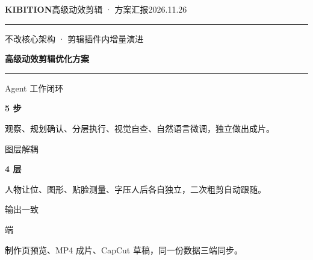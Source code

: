 \documentclass[10pt,a4paper,fontset=none]{ctexart}
\newcommand{\Thin}{\LatinThin\CJKthin}
\begin{document}
\thispagestyle{empty}
\enlargethispage{1.4cm}
\pagecolor{DarkBg}
\color{white}
\hypersetup{linkcolor=white}
\vspace*{-0.6cm}
\noindent
{\fontsize{9.5}{12}\selectfont\textbf{KIBITION}}\hfill{\fontsize{9}{12}\selectfont 高级动效剪辑 · 方案汇报\hspace{1.6em}2026.11.26}\par
\vspace{0.45cm}
{\color{white}\rule{\linewidth}{0.5pt}}

\vspace{1.0cm}
{\fontsize{12}{15}\selectfont 不改核心架构 · 剪辑插件内增量演进\par}
\vspace{0.35cm}
{\fontsize{32}{40}\selectfont\bfseries 高级动效剪辑优化方案\par}

\vspace{0.75cm}
\noindent{}

\vspace{0.5cm}
{\color{white}\rule{\linewidth}{0.8pt}}\par
\vspace{0.45cm}

\noindent
\begin{minipage}[t]{0.3\linewidth}
  {\fontsize{9}{11}\selectfont Agent 工作闭环}\par\vspace{0.12cm}
  {\fontsize{26}{30}\selectfont\bfseries 5 步}\par\vspace{0.3cm}
  {\fontsize{8.5}{15}\selectfont 观察、规划确认、分层执行、视觉自查、自然语言微调，独立做出成片。}
\end{minipage}\hfill
\begin{minipage}[t]{0.3\linewidth}
  {\fontsize{9}{11}\selectfont 图层解耦}\par\vspace{0.12cm}
  {\fontsize{26}{30}\selectfont\bfseries 4 层}\par\vspace{0.3cm}
  {\fontsize{8.5}{15}\selectfont 人物让位、图形、贴脸测量、字压人后各自独立，二次粗剪自动跟随。}
\end{minipage}\hfill
\begin{minipage}[t]{0.3\linewidth}
  {\fontsize{9}{11}\selectfont 输出一致}\par\vspace{0.12cm}
  {\fontsize{26}{30}\selectfont\Thin 3 端}\par\vspace{0.3cm}
  {\fontsize{8.5}{15}\selectfont 制作页预览、MP4 成片、CapCut 草稿，同一份数据三端同步。}
\end{minipage}
\end{document}
